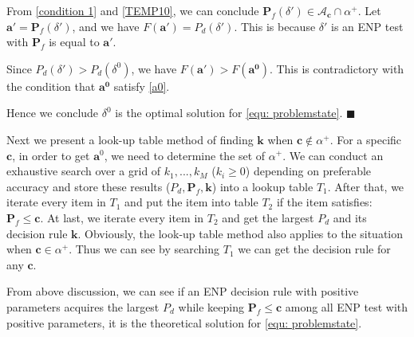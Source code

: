 From \eqref{condition 1} and \eqref{TEMP10}, we can conclude $\mathbf{P}_f(\delta') \in \mathcal{A}_\mathbf{c} \cap \alpha^+$. Let $\mathbf{a}' = \mathbf{P}_f(\delta')$, and we have $F(\mathbf{a}') = P_d(\delta')$. This is because $\delta'$ is an ENP test with $\mathbf{P}_f$ is equal to $\mathbf{a}'$.  

Since $P_d(\delta') > P_d(\delta^0)$, we have $F(\mathbf{a'}) > F(\mathbf{a^0})$. This is contradictory with the condition that $\mathbf{a^0}$ satisfy \eqref{a0}.

Hence we conclude $\delta^0$ is the optimal solution for \eqref{equ: problemstate}. $\blacksquare$

Next we present a look-up table method of finding $\mathbf{k}$ when $\mathbf{c} \notin \alpha^+$. For a specific $\mathbf{c}$, in order to get $\mathbf{a}^0$, we need to determine the set of $\alpha^+$. We can conduct an exhaustive search over a grid of $k_1, ..., k_M$ ($k_i \geq 0$) depending on preferable accuracy and store these results ($P_d, \mathbf{P}_f, \mathbf{k}$) into a lookup table $T_1$. After that, we iterate every item in $T_1$ and put the item into table $T_2$ if the item satisfies:  $\mathbf{P}_f \leq \mathbf{c}$.
At last, we iterate every item in $T_2$ and get the largest $P_d$ and its decision rule $\mathbf{k}$.
Obviously, the look-up table method also applies to the situation when $\mathbf{c} \in \alpha^+$. Thus we can see by searching $T_1$ we can get the decision rule for any $\mathbf{c}$.  

From above discussion, we can see if an ENP decision rule with positive parameters acquires the largest $P_d$ while keeping $\mathbf{P}_f \leq \mathbf{c}$ among all ENP test with positive parameters, it is the theoretical solution for \eqref{equ: problemstate}. 
